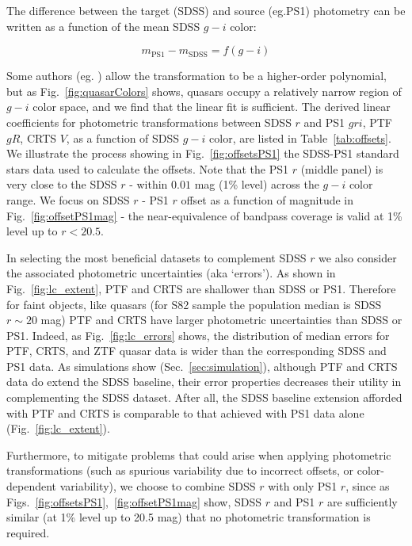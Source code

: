 \documentclass[twocolumn]{aastex62}
\begin{document}
The difference  between the target (SDSS) and source (eg.PS1) photometry can be written as a function of the mean SDSS $g-i$ color: 

\begin{equation}
m_{\mathrm{PS1}} - m_{\mathrm{SDSS}} = f(g-i)
\end{equation}

Some authors (eg. \citealt{li2018}) allow the transformation to be a higher-order polynomial, but as Fig.~\ref{fig:quasarColors} shows, quasars occupy a relatively narrow region of $g-i$ color space, and we find that the linear fit is sufficient. The derived linear coefficients for photometric transformations between SDSS $r$ and PS1 $gri$, PTF $gR$, CRTS $V$,  as a function of SDSS $g-i$ color, are listed in Table~\ref{tab:offsets}. We illustrate the process showing in Fig.~\ref{fig:offsetsPS1} the SDSS-PS1 standard stars data used to calculate the offsets. Note that the PS1 $r$ (middle panel) is very close to the SDSS $r$ - within  $0.01$ mag (1\% level) across the $g-i$ color range. We focus on SDSS $r$ - PS1 $r$ offset as a function of magnitude in Fig.~\ref{fig:offsetPS1mag} - the near-equivalence of bandpass coverage is valid at 1\% level up to $r < 20.5$.  

In selecting the most beneficial datasets to complement SDSS $r$ we also consider the associated photometric uncertainties (aka `errors'). As shown in Fig.~\ref{fig:lc_extent},  PTF and CRTS are shallower than SDSS or PS1. Therefore for faint objects, like quasars (for S82 sample the population median is SDSS $r \sim 20$ mag) PTF and CRTS have larger photometric uncertainties than SDSS or PS1. Indeed, as Fig.~\ref{fig:lc_errors} shows, the distribution of median errors for PTF, CRTS, and ZTF quasar data is wider than the corresponding SDSS and PS1 data. As simulations show (Sec.~\ref{sec:simulation}), although PTF and CRTS data do extend the SDSS baseline, their error properties decreases their utility in complementing the SDSS dataset. After all, the SDSS baseline extension afforded with PTF and CRTS is comparable to that achieved with PS1 data alone (Fig.~\ref{fig:lc_extent}). 

Furthermore, to mitigate problems that could arise when applying photometric transformations (such as spurious variability due to incorrect offsets, or color-dependent variability), we choose to combine SDSS $r$ with only PS1 $r$, since as Figs.~\ref{fig:offsetsPS1},~\ref{fig:offsetPS1mag} show, SDSS $r$ and PS1 $r$ are sufficiently similar (at 1\% level up to 20.5 mag) that no photometric transformation is required. 
\end{document}
